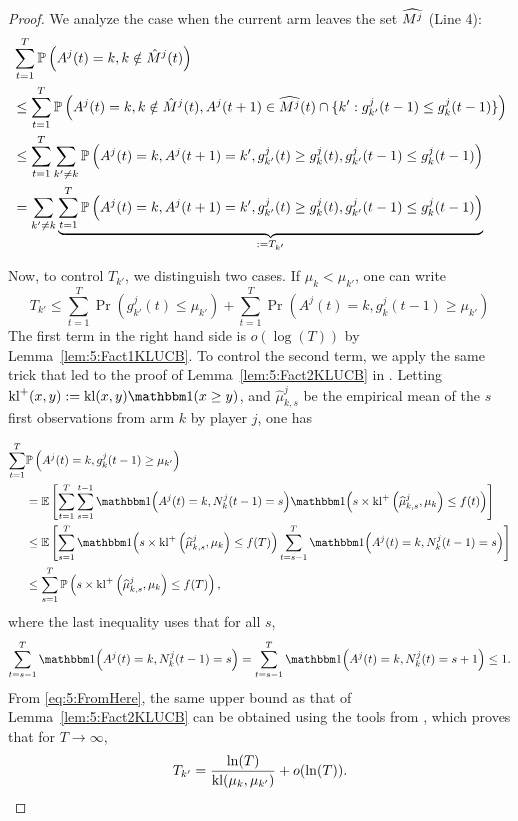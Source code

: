 \begin{proof}
  We analyze the case when the current arm leaves the set $\widehat{M^j}$ (Line 4):
  \begin{align*}
    & \sum_{t=1}^T \mathbb{P}\left(A^j(t) = k, k \notin \hat{M}^j(t)\right)  \\ & \leq \sum_{t=1}^T \mathbb{P}\left(A^j(t) = k, k \notin \hat{M}^j(t), A^j(t+1) \in \widehat{M^j}(t) \cap \{k': g_{k'}^j(t-1) \leq g_k^j(t-1)\}\right) \\
    & \leq   \sum_{t=1}^T \sum_{k' \neq k}\mathbb{P}\left(A^j(t) = k,A^j(t+1) = k', g_{k'}^j(t) \geq g_{k}^j(t), g_{k'}^j(t-1) \leq g_{k}^j(t-1)  \right) \\
    & = \sum_{k' \neq k} \underbrace{\sum_{t=1}^T \mathbb{P}\left(A^j(t) = k,A^j(t+1) = k', g_{k'}^j(t) \geq g_{k}^j(t), g_{k'}^j(t-1) \leq g_{k}^j(t-1)  \right)}_{:= T_{k'}}
  \end{align*}

  Now, to control $T_{k'}$, we distinguish two cases. If $\mu_k < \mu_{k'}$, one can write
  \[T_{k'} \leq \sum_{t=1}^T \Pr\left(g_{k'}^j(t) \leq \mu_{k'}\right) + \sum_{t=1}^T \Pr\left(A^j(t) = k, g_{k}^j(t-1) \geq \mu_{k'}\right)\]
  The first term in the right hand side is $o(\log(T))$ by Lemma~\ref{lem:5:Fact1KLUCB}. To control the second term, we apply the same trick that led to the proof of Lemma~\ref{lem:5:Fact2KLUCB} in \cite{KLUCBJournal}.
  Letting $\kl^+(x, y) := \kl(x, y) \indic(x \geq y)$,
  and $\widehat{\mu}^j_{k,s}$ be the empirical mean of the $s$ first observations from arm $k$ by player $j$, one has

  \begin{align}
    \sum_{t=1}^T & \Pr\left(A^j(t) = k, g_{k}^j(t-1) \geq \mu_{k'}\right) \nonumber\\
    & =  \bE \left[ \sum_{t=1}^T\sum_{s=1}^{t-1} \indic{\left(A^j(t) = k , N^j_k(t-1) = s\right)}\indic{\left( s  \times \kl^+\left(\widehat{\mu}_{k,s}^j , \mu_k\right) \leq f(t)\right)} \right]\nonumber\\
    & \leq \bE \left[ \sum_{s=1}^{T}\indic{\left( s \times \kl^+\left(\widehat{\mu}_{k,s}^j , \mu_k\right) \leq f(T)\right)}\sum_{t=s-1}^T \indic{\left(A^j(t) = k , N^j_k(t-1) = s\right)} \right] \nonumber \\
    & \leq \sum_{s=1}^T \Pr\left( s \times \kl^+\left(\widehat{\mu}_{k,s}^j , \mu_k\right) \leq f(T)\right),\label{eq:5:FromHere}
  \end{align}
  where the last inequality uses that for all $s$, \[\sum_{t=s-1}^T \indic{\left(A^j(t) = k , N^j_k(t-1) = s\right)} = \sum_{t=s-1}^T \indic{\left(A^j(t) = k , N^j_k(t) = s + 1\right)} \leq 1.\]
  From \eqref{eq:5:FromHere}, the same upper bound as that of Lemma~\ref{lem:5:Fact2KLUCB} can be obtained using the tools from \cite{KLUCBJournal}, which proves that for $T\to\infty$,
  \[T_{k'} = \frac{\ln(T)}{\mathrm{kl}(\mu_k,\mu_{k'})} + o(\ln(T)).\]


\end{proof}
